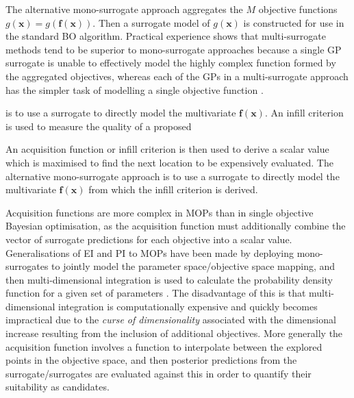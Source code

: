 \documentclass[conference]{IEEEtran}
\newcommand{\parameterspace}{\Omega}
\newcommand{\nobj}{M}
\DeclareMathOperator*{\argmax}{\arg\!\max}
\newcommand\ei{EI\xspace}
\newcommand\gp{GP\xspace}
\newcommand{\bx}{\mathbf{x}}
\newcommand{\bff}{\mathbf{f}}
\begin{document}
The alternative mono-surrogate approach aggregates the $\nobj$ objective functions $g(\bx) = g(\bff(\bx))$.  Then a surrogate model of $g(\bx)$ is constructed for use in the standard BO algorithm. Practical experience shows that multi-surrogate methods tend to be superior to mono-surrogate approaches because a single \gp surrogate is unable to effectively model the highly complex function formed by the aggregated objectives, whereas each of the GPs in a multi-surrogate approach has the simpler task of modelling a single objective function \cite{rahat2017alternative}.   


is to use a surrogate to directly model the multivariate $\bff(\bx)$.   An infill criterion is used to measure the quality of  a proposed 

An acquisition function or infill criterion is then used to derive a scalar value which is maximised to find the next location to be expensively evaluated.  The alternative mono-surrogate approach is to use a surrogate to directly model the multivariate $\bff(\bx)$ from which the infill criterion is derived. 

Acquisition functions are more complex in MOPs than in single objective Bayesian optimisation, as the acquisition function must additionally combine the vector of surrogate predictions for each objective into a scalar value. Generalisations of \ei and PI to MOPs have been made by deploying mono-surrogates to jointly model the parameter space/objective space mapping, and then multi-dimensional integration is used to calculate the probability density function for a given set of parameters \cite{emmerich2006single,keane2006statistical}. The disadvantage of this is that multi-dimensional integration is computationally expensive and quickly becomes impractical due to the \textit{curse of dimensionality} associated with the dimensional increase resulting from the inclusion of additional objectives. More generally the acquisition function involves a function to interpolate between the explored points in the objective space, and then posterior predictions from the surrogate/surrogates are evaluated against this in order to quantify their suitability as candidates. 
\end{document}
